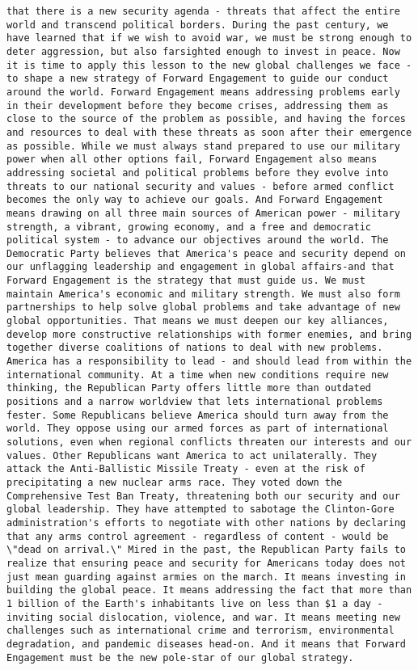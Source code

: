 \documentclass[
]{article}
\begin{document}
\begin{verbatim}
that there is a new security agenda - threats that affect the entire world and transcend political borders. During the past century, we have learned that if we wish to avoid war, we must be strong enough to deter aggression, but also farsighted enough to invest in peace. Now it is time to apply this lesson to the new global challenges we face - to shape a new strategy of Forward Engagement to guide our conduct around the world. Forward Engagement means addressing problems early in their development before they become crises, addressing them as close to the source of the problem as possible, and having the forces and resources to deal with these threats as soon after their emergence as possible. While we must always stand prepared to use our military power when all other options fail, Forward Engagement also means addressing societal and political problems before they evolve into threats to our national security and values - before armed conflict becomes the only way to achieve our goals. And Forward Engagement means drawing on all three main sources of American power - military strength, a vibrant, growing economy, and a free and democratic political system - to advance our objectives around the world. The Democratic Party believes that America's peace and security depend on our unflagging leadership and engagement in global affairs-and that Forward Engagement is the strategy that must guide us. We must maintain America's economic and military strength. We must also form partnerships to help solve global problems and take advantage of new global opportunities. That means we must deepen our key alliances, develop more constructive relationships with former enemies, and bring together diverse coalitions of nations to deal with new problems. America has a responsibility to lead - and should lead from within the international community. At a time when new conditions require new thinking, the Republican Party offers little more than outdated positions and a narrow worldview that lets international problems fester. Some Republicans believe America should turn away from the world. They oppose using our armed forces as part of international solutions, even when regional conflicts threaten our interests and our values. Other Republicans want America to act unilaterally. They attack the Anti-Ballistic Missile Treaty - even at the risk of precipitating a new nuclear arms race. They voted down the Comprehensive Test Ban Treaty, threatening both our security and our global leadership. They have attempted to sabotage the Clinton-Gore administration's efforts to negotiate with other nations by declaring that any arms control agreement - regardless of content - would be \"dead on arrival.\" Mired in the past, the Republican Party fails to realize that ensuring peace and security for Americans today does not just mean guarding against armies on the march. It means investing in building the global peace. It means addressing the fact that more than 1 billion of the Earth's inhabitants live on less than $1 a day - inviting social dislocation, violence, and war. It means meeting new challenges such as international crime and terrorism, environmental degradation, and pandemic diseases head-on. And it means that Forward Engagement must be the new pole-star of our global strategy. 
\end{verbatim}
\end{document}
